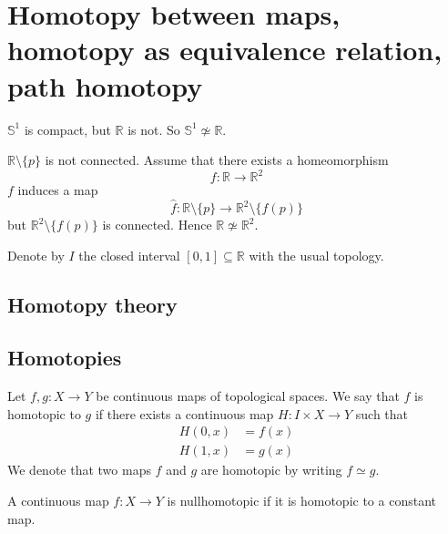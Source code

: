 \section{Homotopy between maps, homotopy as equivalence relation, path homotopy}

\begin{example}
    \( \mathbb{S}^1 \) is compact, but \( \mathbb{R} \) is not.
    So \( \mathbb{S}^1 \not\simeq \mathbb{R} \).
\end{example}

\begin{example}
    \( \mathbb{R} \setminus \{ p \}  \) is not connected.
    Assume that there exists a homeomorphism
    \[
      f: \mathbb{R} \to \mathbb{R}^2
    \]
    \( f \) induces a map
    \[
      \hat{f}: \mathbb{R} \setminus \{ p \}  \to \mathbb{R}^2 \setminus \{ f(p) \} 
    \]
    but \( \mathbb{R}^2 \setminus \{ f(p) \}  \) is connected.
    Hence \( \mathbb{R} \not\simeq \mathbb{R}^2 \).
\end{example}

Denote by \( I \) the closed interval \( [0, 1] \subseteq \mathbb{R} \)
with the usual topology.

\subsection{Homotopy theory}

\subsection{Homotopies}

\begin{definition}[Homotopy]
    Let \( f,g: X \to Y \) be continuous maps
    of topological spaces.
    We say that \( f \) is homotopic to \( g \)
    if there exists a continuous map
    \( H: I \times X \to Y \) such that
    \begin{align}
      H(0, x) &= f(x) \\
      H(1, x) &= g(x)
    \end{align}
    We denote that two maps \( f \) and \( g \) are homotopic
    by writing \( f \simeq g \).
\end{definition}

\begin{definition}[Nullhomotopy]
   A continuous map \( f: X \to Y \)
   is nullhomotopic if it is homotopic
   to a constant map.
\end{definition}

